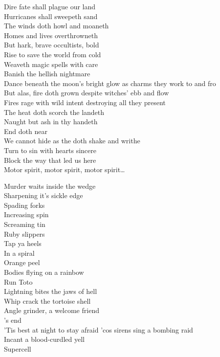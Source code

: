 Dire fate shall plague our land\\
Hurricanes shall sweepeth sand\\
The winds doth howl and moaneth\\
Homes and lives overthrowneth\\
But hark, brave occultists, bold\\
Rise to save the world from cold\\
Weaveth magic spells with care\\
Banish the hellish nightmare\\

Dance beneath the moon's bright glow as charms they work to and fro\\
But alas, fire doth grown despite witches' ebb and flow\\
Fires rage with wild intent destroying all they present\\
The heat doth scorch the landeth\\
Naught but ash in thy handeth\\

End doth near\\
We cannot hide as the  doth shake and writhe\\
Turn to sin with hearts sincere\\
Block the way that led us here\\

Motor spirit, motor spirit, motor spirit…\\



Murder waits inside the wedge\\
Sharpening it's sickle edge\\
Spading forks\\
Increasing spin\\
Screaming tin\\
Ruby slippers\\
Tap ya heels\\
In a spiral\\
Orange peel\\
Bodies flying on a rainbow\\
Run Toto\\
Lightning bites the jaws of hell\\
Whip crack the tortoise shell\\
Angle grinder, a welcome friend\\
's end\\
'Tis best at night to stay afraid 'cos sirens sing a bombing raid\\
Incant a blood-curdled yell\\
Supercell\\

